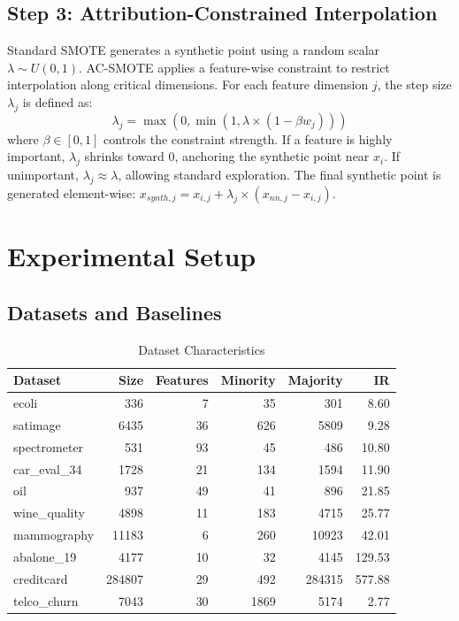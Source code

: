 \documentclass[conference,a4paper]{IEEEtran}
\begin{document}
\subsection{Step 3: Attribution-Constrained Interpolation}
Standard SMOTE generates a synthetic point using a random scalar $\lambda \sim U(0, 1)$. AC-SMOTE applies a feature-wise constraint to restrict interpolation along critical dimensions. For each feature dimension $j$, the step size $\lambda_j$ is defined as:
\begin{equation}
\lambda_j = \max\left(0, \min\left(1, \lambda \times (1 - \beta \hat{w}_j) \right)\right)
\end{equation}
where $\beta \in [0, 1]$ controls the constraint strength. If a feature is highly important, $\lambda_j$ shrinks toward 0, anchoring the synthetic point near $x_i$. If unimportant, $\lambda_j \approx \lambda$, allowing standard exploration. The final synthetic point is generated element-wise: $x_{synth, j} = x_{i, j} + \lambda_j \times (x_{nn, j} - x_{i, j})$.

\section{Experimental Setup}

\subsection{Datasets and Baselines}

\begin{table}[htbp]
\caption{Dataset Characteristics}
\label{tab:datasets}
\centering
\begin{tabular}{lrrrrr}
\toprule
\textbf{Dataset} & \textbf{Size} & \textbf{Features} & \textbf{Minority} & \textbf{Majority} & \textbf{IR} \\
\midrule
ecoli & 336 & 7 & 35 & 301 & 8.60 \\
satimage & 6435 & 36 & 626 & 5809 & 9.28 \\
spectrometer & 531 & 93 & 45 & 486 & 10.80 \\
car_eval_34 & 1728 & 21 & 134 & 1594 & 11.90 \\
oil & 937 & 49 & 41 & 896 & 21.85 \\
wine_quality & 4898 & 11 & 183 & 4715 & 25.77 \\
mammography & 11183 & 6 & 260 & 10923 & 42.01 \\
abalone_19 & 4177 & 10 & 32 & 4145 & 129.53 \\
creditcard & 284807 & 29 & 492 & 284315 & 577.88 \\
telco_churn & 7043 & 30 & 1869 & 5174 & 2.77 \\
\bottomrule
\end{tabular}
\end{table}
\end{document}
